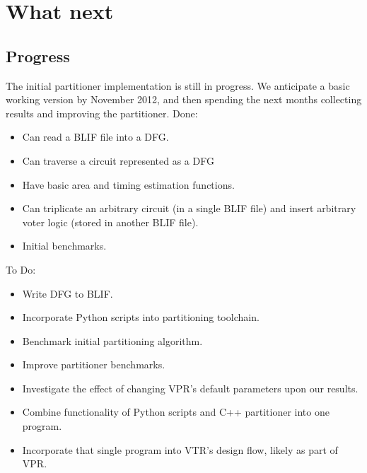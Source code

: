 \documentclass[12pt,final,oneside]{memoir} %
\begin{document}
\chapter{What next}

\section{Progress}
The initial partitioner implementation is still in progress. We anticipate a basic working version by November 2012, and then spending the next months collecting results and improving the partitioner.
Done:
\begin{itemize}
    \item Can read a \ac{BLIF} file into a \ac{DFG}.
    \item Can traverse a circuit represented as a \ac{DFG}
    \item Have basic area and timing estimation functions.
    \item Can triplicate an arbitrary circuit (in a single \ac{BLIF} file) and insert arbitrary voter logic (stored in another \ac{BLIF} file).
    \item Initial benchmarks.
\end{itemize}
To Do:
\begin{itemize}
    \item Write \ac{DFG} to \ac{BLIF}.
    \item Incorporate Python scripts into partitioning toolchain.
    \item Benchmark initial partitioning algorithm.
    \item Improve partitioner benchmarks.
    \item Investigate the effect of changing \ac{VPR}'s default parameters upon our results.
    \item Combine functionality of Python scripts and C++ partitioner into one program.
    \item Incorporate that single program into \ac{VTR}'s design flow, likely as part of \ac{VPR}.
\end{itemize}
\end{document}
